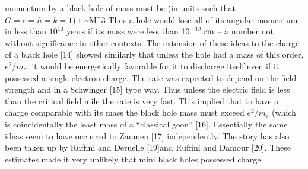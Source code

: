 momentum by a black hole of mass must be (in units such that $G = c = h = k = 1$)
\be
t \sim M^3
\ee
Thus a hole would lose all of its angular momentum in less than $10^{10}$
years if its mass were less than $10^{-13}\,{\rm cm}$ -- a number not without
significance in other contexts. The extension of these ideas to the charge
of a black hole [14] showed similarly that unless the hole had a mass
of this order, $e^2/m_e$, it would be energetically favorable for it to discharge
itself even if it possessed a single electron charge. The rate was expected
to depend on the ﬁeld strength and in a Schwinger [15] type way. Thus unless the
electric field is less than the critical ﬁeld mile the rate is very fast.
This implied that to have a charge comparable with its mass the black hole mass
must exceed $e^2/m_e$ (which is coincidentally the least mass of a ``classical geon'' [16].
Essentially the same ideas seem to have occurred to Zaumen [17] independently.
The story has also been taken up by Rufﬁni and Deruelle [19]and Rufﬁni and Damour [20].
These estimates made it very unlikely that mini black holes possessed charge.



